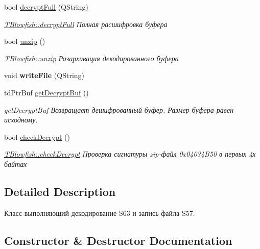 \begin{DoxyCompactItemize}
bool \hyperlink{classunit_test_1_1_t_blowfish_aa6cf535926e4a3daae058725a6192619}{decrypt\+Full} (Q\+String)
\begin{DoxyCompactList}\small\item\em \hyperlink{classunit_test_1_1_t_blowfish_aa6cf535926e4a3daae058725a6192619}{T\+Blowfish\+::decrypt\+Full} Полная расшифровка буфера \end{DoxyCompactList}\item 
bool \hyperlink{classunit_test_1_1_t_blowfish_a17896279118b13a237ab31c1cb82da26}{unzip} ()
\begin{DoxyCompactList}\small\item\em \hyperlink{classunit_test_1_1_t_blowfish_a17896279118b13a237ab31c1cb82da26}{T\+Blowfish\+::unzip} Разархивация декодированного буфера \end{DoxyCompactList}\item 
\mbox{\label{classunit_test_1_1_t_blowfish_a0e634baff0aba9677a41c58c01a6b25a}} 
void {\bfseries write\+File} (Q\+String)
\item 
td\+Ptr\+Buf \hyperlink{classunit_test_1_1_t_blowfish_ab1f9fc3cc9b075c3b9b558b5719c159e}{get\+Decrypt\+Buf} ()
\begin{DoxyCompactList}\small\item\em get\+Decrypt\+Buf Возвращает дешифрованный буфер. Размер буфера равен исходному. \end{DoxyCompactList}\item 
bool \hyperlink{classunit_test_1_1_t_blowfish_a53eba59c588fafe24260a0cf05b7866b}{check\+Decrypt} ()
\begin{DoxyCompactList}\small\item\em \hyperlink{classunit_test_1_1_t_blowfish_a53eba59c588fafe24260a0cf05b7866b}{T\+Blowfish\+::check\+Decrypt} Проверка сигнатуры zip-\/файл 0x04034\+B50 в первых 4х байтах \end{DoxyCompactList}\end{DoxyCompactItemize}


\subsection{Detailed Description}
Класс выполняющий декодирование S63 и запись файла S57. 

\subsection{Constructor \& Destructor Documentation}
\mbox{\label{classunit_test_1_1_t_blowfish_a349e59d7c45d5675376b89def7500c16}} 
